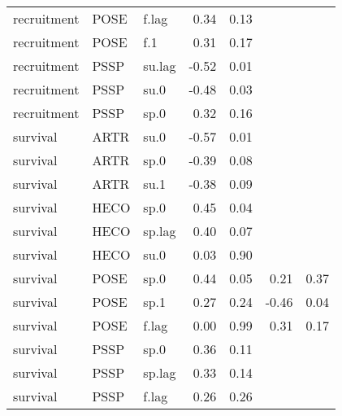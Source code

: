 \begin{table}[ht]
\begin{tabular}{lllrrrr}
  recruitment & POSE & f.lag & 0.34 & 0.13 &  &  \\ 
  recruitment & POSE & f.1 & 0.31 & 0.17 &  &  \\ 
  recruitment & PSSP & su.lag & -0.52 & 0.01 &  &  \\ 
  recruitment & PSSP & su.0 & -0.48 & 0.03 &  &  \\ 
  recruitment & PSSP & sp.0 & 0.32 & 0.16 &  &  \\ 
  survival & ARTR & su.0 & -0.57 & 0.01 &  &  \\ 
  survival & ARTR & sp.0 & -0.39 & 0.08 &  &  \\ 
  survival & ARTR & su.1 & -0.38 & 0.09 &  &  \\ 
  survival & HECO & sp.0 & 0.45 & 0.04 &  &  \\ 
  survival & HECO & sp.lag & 0.40 & 0.07 &  &  \\ 
  survival & HECO & su.0 & 0.03 & 0.90 &  &  \\ 
  survival & POSE & sp.0 & 0.44 & 0.05 & 0.21 & 0.37 \\ 
  survival & POSE & sp.1 & 0.27 & 0.24 & -0.46 & 0.04 \\ 
  survival & POSE & f.lag & 0.00 & 0.99 & 0.31 & 0.17 \\ 
  survival & PSSP & sp.0 & 0.36 & 0.11 &  &  \\ 
  survival & PSSP & sp.lag & 0.33 & 0.14 &  &  \\ 
  survival & PSSP & f.lag & 0.26 & 0.26 &  &  \\ 
   \hline
\end{tabular}
\end{table}

